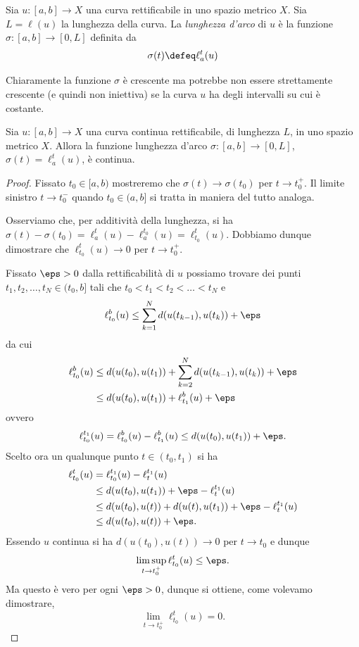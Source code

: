 \begin{definition}
Sia $u \colon [a,b] \to X$ una curva rettificabile in uno spazio metrico $X$.
Sia $L = \ell(u)$ la lunghezza della curva.
La \emph{lunghezza d'arco} di $u$ è la funzione $\sigma\colon [a,b] \to [0,L]$ 
definita da
\begin{equation}\label{def:lunghezza_arco}
  \sigma(t) \defeq \ell_a^t(u)
\end{equation}
\end{definition}

Chiaramente la funzione $\sigma$ è crescente ma potrebbe non essere strettamente crescente 
(e quindi non iniettiva) se la curva $u$ ha degli intervalli su cui è costante.

\begin{theorem}
Sia $u \colon [a,b] \to X$ una curva continua rettificabile, di lunghezza $L$, 
in uno spazio metrico $X$.
Allora la funzione lunghezza d'arco $\sigma\colon [a,b] \to [0,L]$,
$\sigma(t) = \ell_a^t(u)$,
è continua.
\end{theorem}
\begin{proof}
Fissato $t_0\in [a,b)$
mostreremo che $\sigma(t)\to \sigma(t_0)$ per $t\to t_0^+$. Il limite sinistro $t\to t_0^-$ 
quando $t_0\in(a,b]$ si tratta 
in maniera del tutto analoga.

Osserviamo che, per additività della lunghezza, si ha 
$\sigma(t) - \sigma(t_0) = \ell_a^t(u) - \ell_a^{t_0}(u) = \ell_{t_0}^t(u)$.
Dobbiamo dunque dimostrare che $\ell_{t_0}^t(u) \to 0$ per $t\to t_0^+$.

Fissato $\eps>0$ dalla rettificabilità di $u$ 
possiamo trovare dei punti $t_1, t_2, \dots, t_N \in (t_0,b]$
tali che $t_0 < t_1 < t_2 < \dots < t_N$ e
\[
\ell_{t_0}^b(u) 
\le \sum_{k=1}^N d(u(t_{k-1}), u(t_k)) + \eps
\]
da cui
\begin{align*}
\ell_{t_0}^b(u) 
   &\le d(u(t_0), u(t_1)) + \sum_{k=2}^N d(u(t_{k-1}), u(t_k)) + \eps \\
   &\le d(u(t_0), u(t_1)) + \ell_{t_1}^b(u) + \eps
\end{align*}
ovvero
\[
  \ell_{t_0}^{t_1}(u) = \ell_{t_0}^b(u) - \ell_{t_1}^b(u) \le d(u(t_0), u(t_1)) + \eps.
\]
Scelto ora un qualunque punto $t\in (t_0, t_1)$ si ha
\begin{align*}
  \ell_{t_0}^t(u) 
    &= \ell_{t_0}^{t_1}(u) - \ell_t^{t_1}(u) \\
    &\le d(u(t_0), u(t_1)) + \eps - \ell_t^{t_1}(u) \\
    &\le d(u(t_0), u(t)) + d(u(t), u(t_1)) + \eps - \ell_t^{t_1}(u) \\
    &\le d(u(t_0), u(t)) + \eps.
\end{align*}
Essendo $u$ continua si ha $d(u(t_0), u(t)) \to 0$ per $t \to t_0$ 
e dunque
\[
\limsup_{t\to t_0^+} \ell_{t_0}^t(u) \le \eps.
\]
Ma questo è vero per ogni $\eps>0$, dunque si ottiene, come volevamo dimostrare,
\[
\lim_{t\to t_0^+} \ell_{t_0}^t(u) = 0.
\]
\end{proof}

